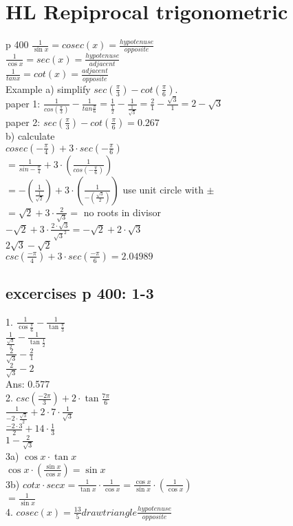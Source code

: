\documentclass{article}
\begin{document}
  \section{HL Repiprocal trigonometric}
  p 400
  $\frac{1}{\sin x}=cosec (x)=\frac{hypotenuse}{opposite}$\\
  $\frac{1}{\cos x}=sec (x)=\frac{hypotenuse}{adjacent}$\\
  $\frac{1}{tan x}=cot (x)=\frac{adjacent}{opposite}$\\
  Example a) simplify $sec(\frac{\pi}{3})-cot(\frac{\pi}{6}).$\\
  paper 1: $\frac{1}{cos(\frac{\pi}{3})}-\frac{1}{tan \frac{\pi}{6}}=\frac{1}{\frac{1}{2}}-\frac{1}{\frac{1}{\sqrt{3}}}=\frac{2}{1}-\frac{\sqrt{3}}{1}=2-\sqrt{3}$\\
  paper 2: $sec(\frac{\pi}{3})-cot(\frac{\pi}{6})=0.267$\\
  b) calculate\\
  $cosec(-\frac{\pi}{4})+3\cdot sec(-\frac{\pi}{6})$\\
  $=\frac{1}{sin- \frac{\pi}{4}}+3\cdot(\frac{1}{cos(-\frac{\pi}{6})})$\\
  $=-(\frac{1}{\frac{1}{\sqrt{2}}})+3\cdot(\frac{1}{-(\frac{\sqrt{3}}{2})})$ use unit circle with $\pm$\\
  $=\sqrt{2}+3\cdot\frac{2}{\sqrt{3}}=$ no roots in divisor\\
  $-\sqrt{2}+3\cdot\frac{2\cdot\sqrt{3}}{\sqrt{3}^2}=-\sqrt{2}+2\cdot\sqrt{3}$\\
  $2\sqrt{3}-\sqrt{2}$\\
  $csc(\frac{-\pi}{4})+3\cdot sec(\frac{-\pi}{6})=2.04989$
  \subsection{excercises p 400: 1-3}
  1. $\frac{1}{\cos \frac{\pi}{6}}-\frac{1}{\tan \frac{\pi}{3}}$\\
  $\frac{1}{\frac{\sqrt{3}}{2}}-\frac{1}{\tan \frac{1}{2}}$\\
  $\frac{2}{\sqrt{3}}-\frac{2}{1}$\\
  $\frac{2}{\sqrt{3}}-2$\\
  Ans: 0.577\\
  2. $csc (\frac{-2\pi}{3})+2\cdot\tan \frac{7\pi}{6}$\\
  $\frac{1}{-2\cdot\frac{\sqrt{3}}{2}}+2\cdot7\cdot\frac{1}{\sqrt{3}}$\\
  $\frac{-2\cdot3}{2}+14\cdot\frac{1}{3}$\\
  $1-\frac{2}{\sqrt{3}}$\\
  3a) $\cos x\cdot\tan x$\\
  $\cos x\cdot(\frac{\sin x}{\cos x})=\sin x$\\
  3b) $cot x\cdot sec x=\frac{1}{\tan x}\cdot\frac{1}{\cos x}=\frac{\cos x}{\sin x}\cdot(\frac{1}{\cos x})$\\
  $=\frac{1}{\sin x}$\\
  4. $cosec (x)=\frac{13}{5} draw triangle \frac{hypotenuse}{opposite}$\\

  
  

  
  

   
\end{document}
